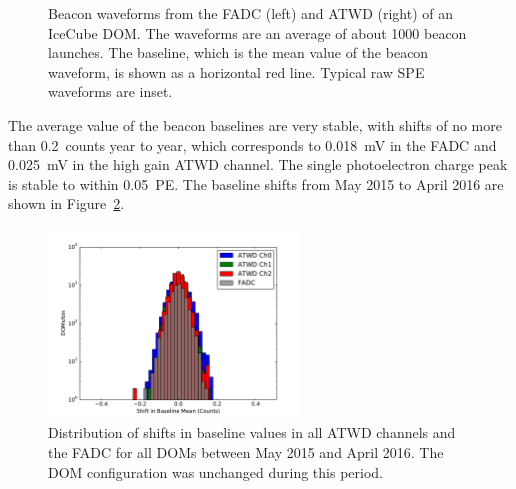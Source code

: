 \begin{figure}[!h]
  \captionsetup[subfigure]{labelformat=empty}
  \centering
  \caption{Beacon waveforms from the FADC (left) and ATWD (right) of
    an IceCube DOM. The waveforms are an average of about 1000 beacon
   launches. The baseline, which is the mean value of the
    beacon waveform, is shown as a horizontal red line. Typical raw SPE
    waveforms are inset.}
  \label{fig:raw_baselines}
\end{figure}


The average value of the
beacon baselines are very stable, with shifts of no more than
0.2~counts year to year, which corresponds to 0.018~mV in the FADC and
0.025~mV in the high gain ATWD channel. The single photoelectron
charge peak is stable to within 0.05~PE. The baseline shifts from May
2015 to April 2016 are shown in
Figure~\ref{fig:baseline_stability_2015}. 

\begin{figure}[!h]
 \centering
 \includegraphics[width=0.6\textwidth]{graphics/dom/reliability/baseline_stability_2015.pdf}
 \caption{Distribution of shifts in baseline values in all ATWD
   channels and the FADC for all DOMs between May 2015 and April
   2016. The DOM configuration was unchanged during this period.}
 \label{fig:baseline_stability_2015}
\end{figure}

